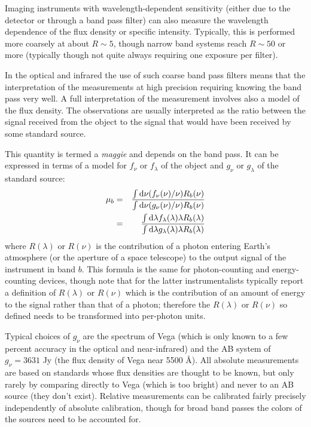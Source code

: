 Imaging instruments with wavelength-dependent sensitivity (either due
to the detector or through a band pass filter) can also measure the
wavelength dependence of the flux density or specific
intensity. Typically, this is performed more coarsely at about $R\sim
5$, though narrow band systems reach $R\sim 50$ or more (typically
though not quite always requiring one exposure per filter).

In the optical and infrared the use of such coarse band pass filters
means that the interpretation of the measurements at high precision
requiring knowing the band pass very well. A full interpretation of
the measurement involves also a model of the flux density. The
observations are usually interpreted as the ratio between the signal
received from the object to the signal that would have been received
by some standard source.

This quantity is termed a {\it maggie} and depends on the band
pass. It can be expressed in terms of a model for $f_\nu$ or
$f_\lambda$ of the object and $g_\nu$ or $g_\lambda$ of the standard
source:
\begin{eqnarray}
  \mu_b &=&
  \frac{\int {\rm d}\nu (f_\nu(\nu)/\nu) R_b(\nu)}
       {\int {\rm d}\nu (g_\nu(\nu)/\nu) R_b(\nu)} \cr
       &=&
  \frac{\int {\rm d}\lambda f_\lambda(\lambda) \lambda R_b(\lambda) }
       {\int {\rm d}\lambda g_\lambda(\lambda) \lambda R_b(\lambda)} 
\end{eqnarray}
where $R(\lambda)$ or $R(\nu)$ is the contribution of a photon
entering Earth's atmosphere (or the aperture of a space telescope) to
the output signal of the instrument in band $b$. This formula is the
same for photon-counting and energy-counting devices, though note that
for the latter instrumentalists typically report a definition of
$R(\lambda)$ or $R(\nu)$ which is the contribution of an amount of
energy to the signal rather than that of a photon; therefore the
$R(\lambda)$ or $R(\nu)$ so defined needs to be transformed into
per-photon units.

Typical choices of $g_\nu$ are the spectrum of Vega (which is only
known to a few percent accuracy in the optical and near-infrared) and
the AB system of $g_\nu = 3631$ Jy (the flux density of Vega near 5500
\AA).  All absolute measurements are based on standards whose flux
densities are thought to be known, but only rarely by comparing
directly to Vega (which is too bright) and never to an AB source (they
don't exist). Relative measurements can be calibrated fairly precisely
independently of absolute calibration, though for broad band passes
the colors of the sources need to be accounted for.

